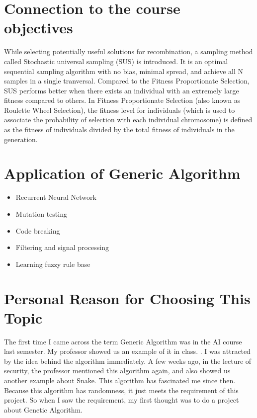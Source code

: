 \documentclass[letterpaper, 10 pt, conference]{ieeeconf}  %
\begin{document}
\section{Connection to the course objectives}

While selecting potentially useful solutions for recombination, a sampling method called
Stochastic universal sampling (SUS) is introduced. It is an optimal sequential sampling 
algorithm with no bias, minimal spread, and achieve all N samples in a single tranversal. \cite{bj87} Compared to the Fitness Proportionate
Selection, SUS performs better when there exists an individual with an extremely large fitness
compared to others. \cite{wikisus} In Fitness Proportionate Selection (also known as Roulette Wheel
Selection), the fitness level for individuals (which is used to associate the probability of selection with each
 individual chromosome) is defined as the fitness of individuals divided by the total fitness of individuals
 in the generation. \cite{wikifps}

 \section{Application of Generic Algorithm}
 \begin{itemize}
    \item Recurrent Neural Network
    \item Mutation testing
    \item Code breaking
    \item Filtering and signal processing
    \item Learning fuzzy rule base \cite{gfg}
 \end{itemize}

 \section{Personal Reason for Choosing This Topic}
 The first time I came across the term Generic Algorithm was in the AI course last semester. My professor showed us
 an example of it in class. \cite{gaeg1}. I was attracted by the idea behind the algorithm immediately. A few weeks ago,
 in the lecture of security, the professor mentioned this algorithm again, and also showed us another example about Snake. \cite{gaeg2}
This algorithm has fascinated me since then. Because this algorithm has randomness, it just meets the requirement of this
project. So when I saw the requirement, my first thought was to do a project about Genetic Algorithm.




\end{document}
